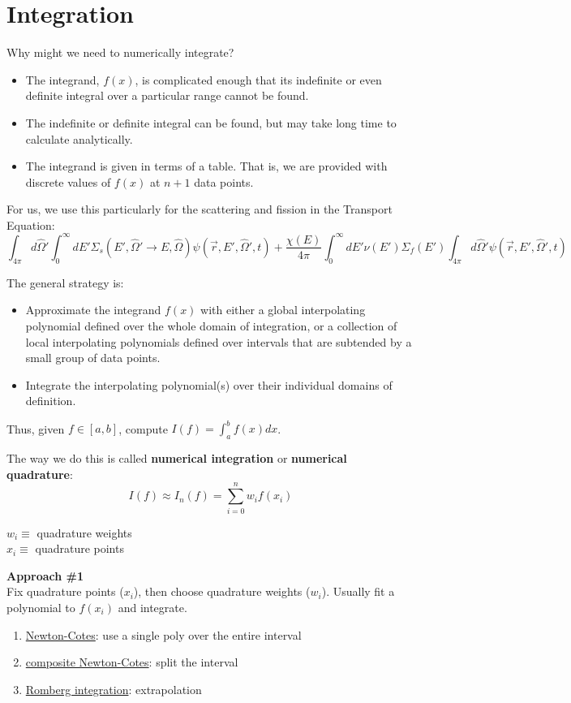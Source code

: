 \documentclass[12pt]{article}
\newcommand{\vOmega}{\ensuremath{\hat{\Omega}}}
\begin{document}
\vspace*{-2em}
\section*{Integration}
Why might we need to numerically integrate?
\begin{itemize}
\item The integrand, $f(x)$, is complicated enough that its
indefinite or even definite integral over a particular range cannot
be found.
\item The indefinite or definite integral can be found, but may take
long time to calculate analytically.
\item The integrand is given in terms of a table. That is, we are
provided with discrete values of $f(x)$ at $n+1$ data points.
\end{itemize}

For us, we use this particularly for the scattering and fission in the Transport Equation:
\[\int_{4\pi} d\vOmega' \int_0^{\infty} dE' \Sigma_s(E', \vOmega' \rightarrow E, \vOmega) \psi(\vec{r}, E', \vOmega', t)  +
 \frac{\chi(E)}{4\pi} \int_0^{\infty} dE' \nu(E') \Sigma_f(E') \int_{4\pi} d\vOmega' \psi(\vec{r}, E', \vOmega', t) \]

The general strategy is:
\begin{itemize}
\item Approximate the integrand $f(x)$ with either a global interpolating
polynomial defined over the whole domain of integration, or a
collection of local interpolating polynomials defined over intervals
that are subtended by a small group of data points.
\item Integrate the interpolating polynomial(s) over their individual
domains of definition.
\end{itemize}

Thus, given $f \in[a,b]$, compute $I(f) = \int_a^b f(x) dx$.

The way we do this is called \textbf{numerical integration} or \textbf{numerical quadrature}:
\[I(f) \approx I_n(f) = \sum_{i=0}^n w_i f(x_i)\]
\vspace*{-3em}

$w_i \equiv$ quadrature weights\\
$x_i \equiv$ quadrature points

\textbf{Approach \#1}\\
Fix quadrature points ($x_i$), then choose quadrature weights ($w_i$). Usually fit a polynomial to $f(x_i)$ and integrate.
%
\begin{enumerate}%
\item \underline{Newton-Cotes}: use a single poly over the entire interval
\item \underline{composite Newton-Cotes}: split the interval
\item \underline{Romberg integration}: extrapolation
\end{enumerate}
\end{document}
